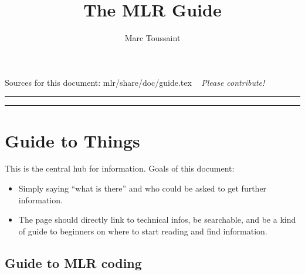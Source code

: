 
 
\title{The MLR Guide}
\author{Marc Toussaint}


\maketitle

\centerline{Sources for this document: mlr/share/doc/guide.tex ~ \emph{Please contribute!}}

{\bigskip\hrule\vspace*{-2ex}\small\tableofcontents\medskip\hrule}

\section{Guide to Things}

This is the central hub for information. Goals of this document:
\begin{itemize}
\item Simply saying ``what is there'' and who could be asked to get further information.

\item The page should directly link to technical infos, be searchable, and be a kind of guide to beginners on where to start reading and find information.
\end{itemize}


\subsection{Guide to MLR coding}

